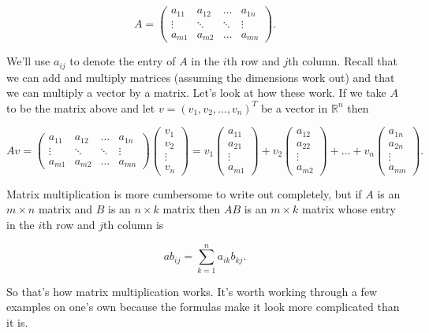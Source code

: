 \documentclass[12pt]{article}
\begin{document}
$$A = 
\begin{pmatrix} 
a_{11} & a_{12} & \ldots & a_{1n} \\
\vdots  & \ddots & \ddots & \vdots \\
a_{m1} & a_{m2} & \ldots & a_{mn}
\end{pmatrix}.$$

We'll use $a_{ij}$ to denote the entry of $A$ in the $i$th row and $j$th column. Recall that we can add and multiply matrices (assuming the dimensions work out) and that we can multiply a vector by a matrix. Let's look at how these work. If we take $A$ to be the matrix above and let $v = (v_1, v_2, \ldots, v_n)^T$ be a vector in $\mathbb{R}^n$ then
 
\[ Av = \begin{pmatrix} 
a_{11} & a_{12} & \ldots & a_{1n} \\
\vdots  & \ddots & \ddots & \vdots \\
a_{m1} & a_{m2} & \ldots & a_{mn}
\end{pmatrix}
%
\begin{pmatrix}
v_1 \\
v_2 \\
\vdots \\
v_n
\end{pmatrix} = 
%
v_1  \begin{pmatrix}
a_{11} \\
a_{21} \\
\vdots \\
a_{m1}
\end{pmatrix} +
%
v_2  \begin{pmatrix}
a_{12} \\
a_{22} \\
\vdots \\
a_{m2}
\end{pmatrix} +
\ldots +
%
v_n  \begin{pmatrix}
a_{1n} \\
a_{2n} \\
\vdots \\
a_{mn}
\end{pmatrix} .\]

Matrix multiplication is more cumbersome to write out completely, but if $A$ is an $m \times n$ matrix and $B$ is an $n \times k$ matrix then $AB$ is an $m \times k$ matrix whose entry in the $i$th row and $j$th column is

$$ab_{ij} = \sum_{k = 1}^n a_{ik}b_{kj}.$$


So that's how matrix multiplication works. It's worth working through a few examples on one's own because the formulas make it look more complicated than it is.
\end{document}
